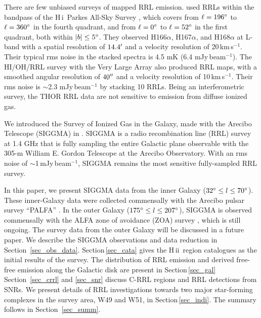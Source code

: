 \documentclass[manuscript]{aastex61}
\newcommand{\hii}{{\rm H\,}{{\sc ii}}}
\newcommand{\hi}{{\rm H\,}{{\sc i}}}
\newcommand{\kms}{\,km\,s$^{-1}$}
\begin{document}
There are few unbiased surveys of mapped RRL emission.
\citet{Alves2010,Alves2012,Alves2015} used RRLs within the bandpass of the \hi\ Parkes All-Sky Survey \citep[HIPASS;][]{Staveley1996}, which covers from $\ell=196\mbox{$^\circ$}$ to $\ell=360\mbox{$^\circ$}$ in the fourth quadrant, and from $\ell = 0\mbox{$^\circ$}$ to $\ell = 52\mbox{$^\circ$}$ in the first quadrant, both within $|b| \leq 5\mbox{$^\circ$}$.
They observed H166$\alpha$, H167$\alpha$, and H168$\alpha$ at L-band with a spatial resolution of $14.4\mbox{$^\prime$}$ and a velocity resolution of 20\kms.  Their typical rms noise in the stacked spectra is 4.5 mK (6.4 mJy\,beam$^{-1}$).
The HI/OH/RRL survey with the Very Large Array \citep[THOR;][]{Beuther2016} also produced RRL maps, with a smoothed angular resolution of $40\mbox{$^{\prime\prime}$}$ and a velocity resolution of 10\kms. Their rms noise is $\sim$2.3 mJy\,beam$^{-1}$ by stacking 10 RRLs.
Being an interferometric survey, the THOR RRL data are not sensitive to emission from diffuse ionized gas.

We introduced the Survey of Ionized Gas in the Galaxy, made with the Arecibo Telescope (SIGGMA) in \citet[hereafter ``Paper I'']{Liu2013}.
SIGGMA is a radio recombination line (RRL) survey at 1.4 GHz that is fully sampling the entire Galactic plane observable with the 305-m William E. Gordon Telescope at the Arecibo Observatory.
With an rms noise of $\sim$1\,mJy\,beam$^{-1}$, SIGGMA remains the most sensitive fully-sampled RRL survey.

In this paper, we present SIGGMA data from the inner Galaxy ($32 \mbox{$^\circ$} \leq l \leq 70 \mbox{$^\circ$}$).
These inner-Galaxy data were collected commensally with the Arecibo pulsar survey ``PALFA'' \citep{Cordes2006, Lazarus2015}.
In the outer Galaxy ($175 \mbox{$^\circ$} \leq l \leq 207 \mbox{$^\circ$} $), SIGGMA is observed commensally with the ALFA zone of avoidance (ZOA) survey \citep[][]{McIntyre2015}, which is still ongoing.
The survey data from the outer Galaxy will be discussed in a future paper. 
We describe the SIGGMA observations and data reduction in Section~\ref{sec_obs_data}.
Section\,\ref{sec_cata} gives the \hii\ region catalogues as the initial results of the survey. 
The distribution of RRL emission and derived free-free emission along the Galactic disk are present in Section\,\ref{sec_gal} 
Section~\ref{sec_crrl} and \ref{sec_snr} discuss C-RRL regions and RRL detections from SNRs.
We present details of RRL investigations towards two major star-forming complexes in the survey area, W49 and W51, in Section\,\ref{sec_indi}.
The summary follows in Section~\ref{sec_summ}.
\end{document}
